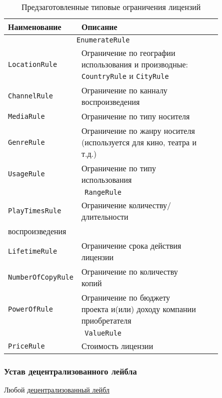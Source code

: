 \documentclass[12pt]{report}
\def\code#1{\colorbox{light-gray}{\texttt{#1}}}
\begin{document}
\begin{table}[h]
\centering
\caption{Предзаготовленные типовые ограничения лицензий}
\begin{tabular}{p{0.2\linewidth}p{0.65\linewidth}cc}
\toprule
Наименование & Описание \\
\bottomrule
\toprule
\multicolumn{2}{c}{\code{EnumerateRule}} \\
\midrule
	\code{LocationRule} & Ограничение по географии использования и производные: \code{CountryRule} и \code{CityRule} \\
	\code{ChannelRule} & Ограничение по канналу воспроизведения \\
	\code{MediaRule} & Ограничение по типу носителя \\
	\code{GenreRule} & Ограничение по жанру носителя (используется для кино, театра и т.д.) \\
	\code{UsageRule} & Ограничение по типу использования \\
\bottomrule
\toprule
\multicolumn{2}{c}{\code{RangeRule}} \\
\midrule
	\code{PlayTimesRule} & Ограничение количеству/длительности \\ воспроизведения \\
	\code{LifetimeRule} & Ограничение срока действия лицензии \\
	\code{NumberOfCopyRule} & Ограничение по количеству копий \\
	\code{PowerOfRule} & Ограничение по бюджету проекта и(или) доходу компании приобретателя \\
\bottomrule
\toprule
\multicolumn{2}{c}{\code{ValueRule}} \\
\midrule
	\code{PriceRule} & Стоимость лицензии \\
\bottomrule
\end{tabular}
\end{table}

\subsubsection{Устав децентрализованного лейбла}
\label{tech-apps-dal-charter}
\begin{multicols}{2}
Любой \hyperref[tech-apps-dal]{децентрализованный лейбл} 
\end{multicols}
\end{document}
